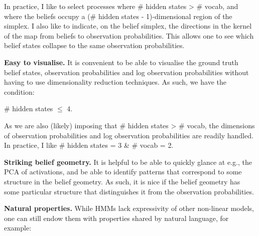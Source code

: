 In practice, I like to select processes where \# hidden states \textgreater{} \# vocab, and where the beliefs occupy a (\# hidden states - 1)-dimensional region of the simplex. I also like to indicate, on the belief simplex, the directions in the kernel of the map from beliefs to observation probabilities. This allows one to see which belief states collapse to the same observation probabilities.

\textbf{Easy to visualise.} It is convenient to be able to visualise the ground truth belief states, observation probabilities and log observation probabilities without having to use dimensionality reduction techniques. As such, we have the condition:

\# hidden states \(\le\) 4.

As we are also (likely) imposing that \# hidden states \textgreater{} \# vocab, the dimensions of observation probabilities and log observation probabilities are readily handled. In practice, I like \# hidden states = 3 \& \# vocab = 2.

\textbf{Striking belief geometry.} It is helpful to be able to quickly glance at e.g., the PCA of activations, and be able to identify patterns that correspond to some structure in the belief geometry. As such, it is nice if the belief geometry has some particular structure that distinguishes it from the observation probabilities.

\textbf{Natural properties.} While HMMs lack expressivity of other non-linear models, one can still endow them with properties shared by natural language, for example:

